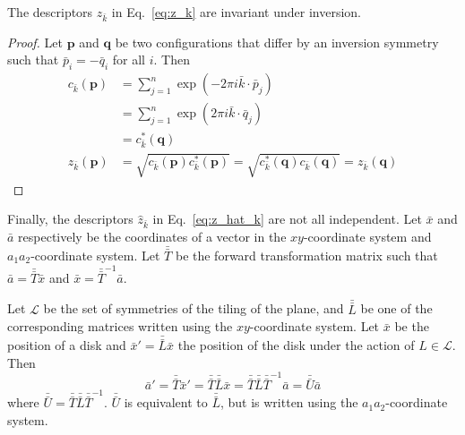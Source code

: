 \documentclass[default,iicol]{sn-jnl}%
\theoremstyle{thmstyleone}%
\theoremstyle{thmstyletwo}%
\theoremstyle{thmstylethree}%
\renewcommand{\vec}[1]{\bar{#1}}
\providecommand{\mat}[1]{\bar{\bar{#1}}}
\providecommand{\config}[1]{\mathbf{#1}}
\providecommand{\rmi}{i}
\begin{document}
\begin{appendices}
	
	The descriptors $z_{\vec{k}}$ in Eq.\ \ref{eq:z_k} are invariant under inversion.
	\begin{proof}
		Let $\config{p}$ and $\config{q}$ be two configurations that differ by an inversion symmetry such that $\vec{p}_i = -\vec{q}_i$ for all $i$. Then
		\begin{align*} 
			c_{\vec{k}}(\config{p}) &= 
			\sum_{j = 1}^{n} \exp{(-2\pi \rmi \vec{k} \cdot \vec{p}_j)} \\ \nonumber 
			&= \sum_{j = 1}^{n} \exp{(2\pi \rmi \vec{k} \cdot \vec{q}_j)} \\ \nonumber
			&= c_{\vec{k}}^\ast(\config{q}) \nonumber \\ 
			z_{\vec{k}}(\config{p}) &= \sqrt{c_{\vec{k}}(\config{p}) c_{\vec{k}}^\ast(\config{p})} = \sqrt{c_{\vec{k}}^\ast(\config{q}) c_{\vec{k}}(\config{q})} = z_{\vec{k}}(\config{q})
		\end{align*}
	\end{proof}
	
	Finally, the descriptors $\hat{z}_{\vec{k}}$ in Eq.\ \ref{eq:z_hat_k} are not all independent. Let $\vec{x}$ and $\vec{a}$ respectively be the coordinates of a vector in the $xy$-coordinate system and $a_1a_2$-coordinate system. Let $\mat{T}$ be the forward transformation matrix such that $\vec{a} = \mat{T} \vec{x}$ and $\vec{x} = \mat{T}^{-1} \vec{a}$. 
	
	Let $\mathcal{L}$ be the set of symmetries of the tiling of the plane, and $\mat{L}$ be one of the corresponding matrices written using the $xy$-coordinate system. Let $\vec{x}$ be the position of a disk and $\vec{x}' = \mat{L} \vec{x}$ the position of the disk under the action of $L \in \mathcal{L}$. Then
	\begin{equation*} 
	\vec{a}' = \mat{T} \vec{x}' = \mat{T} \mat{L} \vec{x} = \mat{T} \mat{L} \mat{T}^{-1} \vec{a} = \mat{U} \vec{a}  
	\end{equation*}
	where $\mat{U} = \mat{T} \mat{L} \mat{T}^{-1}$. $\mat{U}$ is equivalent to $\mat{L}$, but is written using the $a_1a_2$-coordinate system.
	

\end{appendices}
\end{document}
